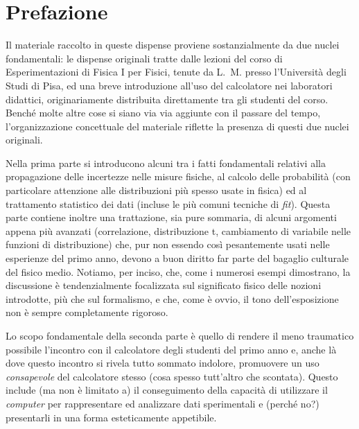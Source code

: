 \thispagestyle{empty}

\chapter*{Prefazione}

Il materiale raccolto in queste dispense proviene sostanzialmente
da due nuclei fondamentali: le dispense originali tratte dalle lezioni
del corso di Esperimentazioni di Fisica I per Fisici,
tenute da L.~M. presso l'Universit\`a degli Studi di Pisa,
ed una breve introduzione all'uso del calcolatore nei laboratori didattici,
originariamente distribuita direttamente tra gli studenti del corso.
Bench\'e molte altre cose si siano via via aggiunte con il passare del tempo,
l'organizzazione concettuale del materiale riflette la presenza di questi due
nuclei originali.

Nella prima parte si introducono alcuni tra i fatti fondamentali relativi
alla propagazione delle incertezze nelle misure fisiche, al calcolo delle
probabilit\`a (con particolare attenzione alle distribuzioni pi\`u spesso
usate in fisica) ed al trattamento statistico dei dati (incluse le pi\`u
comuni tecniche di \emph{fit}).
Questa parte contiene inoltre una trattazione, sia pure sommaria, di alcuni
argomenti appena pi\`u avanzati (correlazione, distribuzione t, cambiamento di
variabile nelle funzioni di distribuzione) che, pur non essendo cos\`i
pesantemente usati nelle esperienze del primo anno, devono a buon diritto far
parte del bagaglio culturale del fisico medio.
Notiamo, per inciso, che, come i numerosi esempi dimostrano, la discussione \`e
tendenzialmente focalizzata sul significato fisico delle nozioni introdotte,
pi\`u che sul formalismo, e che, come \`e ovvio, il tono dell'esposizione non
\`e sempre completamente rigoroso.

Lo scopo fondamentale della seconda parte \`e quello di rendere il meno
traumatico possibile l'incontro con il calcolatore degli studenti del primo
anno e, anche l\`a dove questo incontro si rivela tutto sommato indolore,
promuovere un uso \emph{consapevole} del calcolatore stesso (cosa spesso
tutt'altro che scontata).
Questo include (ma non \`e limitato a) il conseguimento della capacit\`a di
utilizzare il \emph{computer} per rappresentare ed analizzare dati
sperimentali e (perch\'e no?) presentarli in una forma esteticamente
appetibile.


